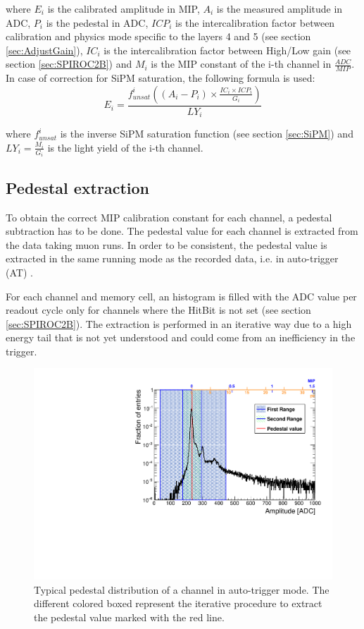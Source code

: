 where $E_i$ is the calibrated amplitude in MIP, $A_i$ is the measured amplitude in ADC, $P_i$ is the pedestal in ADC, $ICP_i$ is the intercalibration factor between calibration and physics mode specific to the layers 4 and 5 (see section \ref{sec:AdjustGain}), $IC_i$ is the intercalibration factor between High/Low gain (see section \ref{sec:SPIROC2B}) and $M_{i}$ is the MIP constant of the i-th channel in $\frac{ADC}{MIP}$. In case of correction for SiPM saturation, the following formula is used:
\begin{equation}
	E_i = \frac{f^{i}_{unsat}( (A_i - P_i) \times \frac{IC_i \times ICP_i}{G_i} )}{LY_{i}}
\end{equation}

where $f^{i}_{unsat}$ is the inverse SiPM saturation function (see section \ref{sec:SiPM}) and $LY_{i} = \frac{M_{i}}{G_i}$ is the light yield of the i-th channel.

\subsection{Pedestal extraction}

To obtain the correct MIP calibration constant for each channel, a pedestal subtraction has to be done. The pedestal value for each channel is extracted from the data taking muon runs. In order to be consistent, the pedestal value is extracted in the same running mode as the recorded data, i.e. in auto-trigger (AT) \cite{Hermberg:2015gaa, SarahMaster}.

For each channel and memory cell, an histogram is filled with the ADC value per readout cycle only for channels where the HitBit is not set (see section \ref{sec:SPIROC2B}). The extraction is performed in an iterative way due to a high energy tail that is not yet understood and could come from an inefficiency in the trigger.

\begin{figure}[htbp!]
	\centering
	\includegraphics[width=0.6\linewidth]{../Thesis_Plots/EnergyCalib/Plots/PedestalExtractionExample.pdf}
	\caption{Typical pedestal distribution of a channel in auto-trigger mode. The different colored boxed represent the iterative procedure to extract the pedestal value marked with the red line.} \label{fig:PedExtraction}
\end{figure}

